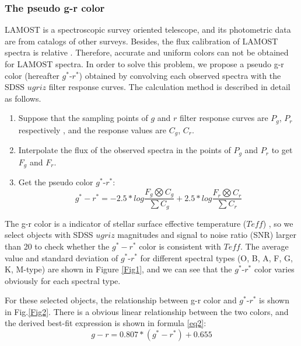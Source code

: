 \documentclass[manuscript]{aastex}
\begin{document}
\subsubsection{The pseudo g-r color}
LAMOST is a spectroscopic survey oriented telescope, and its photometric data are from catalogs of other surveys.
Besides, the flux calibration of LAMOST spectra is relative \citep{bai2012lamost}.
Therefore, accurate and uniform  colors can not be obtained for LAMOST spectra.
In order to solve this problem, we propose a pseudo g-r color (hereafter $g^*$-$r^*$) obtained by convolving each observed spectra with the SDSS $ugriz$ filter response curves.
The calculation method is described in detail  as follows.
\begin{enumerate}
 \item Suppose that the sampling points of   $g$ and $r$ filter response curves are $P_g$, $P_r$ respectively , and the response values are $C_g$, $C_r$.
 \item Interpolate the  flux of the observed spectra in the points of $P_g$ and $P_r$  to get $F_g$ and $F_r$.
 \item Get the pseudo color $g^*$-$r^*$:
 \begin{equation}
        g^*-r^*=-2.5*log\frac{F_g\bigotimes C_g}{\sum C_g} +2.5*log\frac{ F_r\bigotimes C_r}{\sum C_r}
       \end{equation}
\end{enumerate}


The g-r color  is a indicator of stellar surface effective temperature ($Teff$) \citep{lee2008segue,ivezic2008milky},
so we select objects with SDSS $ugriz$ magnitudes and signal to noise ratio (SNR) larger than 20 to check  whether
the $g^*-r^*$  color is consistent with $Teff$.
The average value and standard deviation of $g^*$-$r^*$ for different spectral types (O, B, A, F, G, K, M-type) are shown in Figure \ref{Fig1}, and we can see that the $g^*$-$r^*$ color varies obviously for each spectral type.


For these selected objects, the relationship between g-r color and $g^*$-$r^*$ is  shown in Fig.\ref{Fig2}.
There is a obvious linear relationship between the two colors,
and the derived best-fit expression is shown in formula \ref{eq2}:
\begin{equation}
 g-r=0.807* (g^*-r^*)+  0.655
 \label{eq2}
\end{equation}
\end{document}
